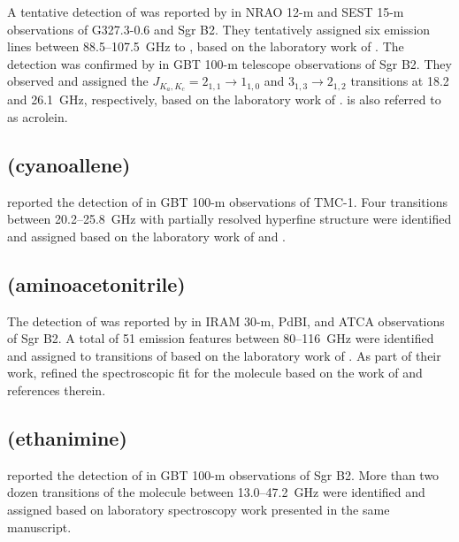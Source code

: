\documentclass[twocolumn]{aastex631}
\begin{document}
	A tentative detection of  was reported by \citet{Dickens:2001uc} in NRAO 12-m and SEST 15-m observations of G327.3-0.6 and Sgr B2.  They tentatively assigned six emission lines between 88.5--107.5~GHz to , based on the laboratory work of \citet{Winnewisser:1975kq}.  The detection was confirmed by \citet{Hollis:2004oc} in GBT 100-m telescope observations of Sgr B2.  They observed and assigned the $J_{K_a,K_c} = 2_{1,1}\rightarrow1_{1,0}$ and $3_{1,3}\rightarrow2_{1,2}$ transitions at 18.2 and 26.1~GHz, respectively, based on the laboratory work of \citet{Blom:1984is}.   is also referred to as acrolein.
	
	\subsection{ (cyanoallene)}
	\label{CH2CCHCN}
	
	\citet{Lovas:2006pq} reported the detection of  in GBT 100-m observations of TMC-1.  Four transitions between 20.2--25.8~GHz with partially resolved hyperfine structure were identified and assigned based on the laboratory work of \citet{Bouchy:1973db} and \citet{Schwahn:1986ei}.
	
	\subsection{ (aminoacetonitrile)}
	\label{NH2CH2CN}
	
	The detection of  was reported by \citet{Belloche:2008jy} in IRAM 30-m, PdBI, and ATCA observations of Sgr B2. A total of 51 emission features between 80--116~GHz were identified and assigned to transitions of  based on the laboratory work of \citet{Bogey:1990ej}.  As part of their work, \citet{Belloche:2008jy} refined the spectroscopic fit for the molecule based on the work of \citet{Bogey:1990ej} and references therein.
	
	\subsection{ (ethanimine)}
	\label{CH3CHNH}
	
	\citet{Loomis:2013fs} reported the detection of  in GBT 100-m observations of Sgr B2.  More than two dozen transitions of the molecule between 13.0--47.2~GHz were identified and assigned based on laboratory spectroscopy work presented in the same manuscript.
	
\end{document}
